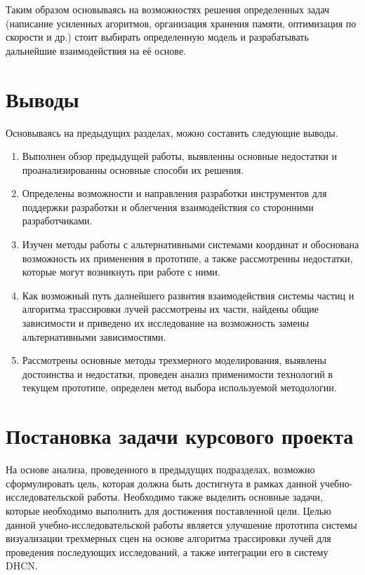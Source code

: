 Таким образом основываясь на возможностях решения определенных задач (написание усиленных агоритмов, организация хранения памяти, оптимизация по скорости и др.) стоит выбирать определенную модель и разрабатывать дальнейшие взаимодействия на её основе. 

\section{Выводы}

Основываясь на предыдущих разделах, можно составить следующие выводы.

\begin{enumerate}
	\item Выполнен обзор предыдущей работы, выявленны основные недостатки и проанализированны основные способи их решения.
	\item Определены возможности и направления разработки инструментов для поддержки разработки и облегчения взаимодействия со сторонними разработчиками.
	\item Изучен методы работы с альтернативными системами координат и обоснована возможность их применения в прототипе, а также рассмотренны недостатки, которые могут возникнуть при работе с ними.
	\item Как возможный путь далнейшего развития взаимодействия системы частиц и алгоритма трассировки лучей рассмотрены их части, найдены общие зависимости и приведено их исследование на возможность замены альтернативными зависимостями.
	\item Рассмотрены основные методы трехмерного моделирования, выявлены достоинства и недостатки, проведен анализ применимости технологий в текущем прототипе, определен метод выбора используемой методологии.
\end{enumerate}



\section{Постановка задачи курсового проекта}

На основе анализа, проведенного в предыдущих подразделах, возможно сформулировать цель, которая должна быть достигнута в рамках данной учебно-исследовательской работы. Необходимо также выделить основные задачи, которые необходимо выполнить для достижения поставленной цели. Целью данной учебно-исследовательской работы является улучшение прототипа системы визуализации трехмерных сцен на основе алгоритма трассировки лучей для проведения последующих исследований, а также интеграции его в систему DHCN.

